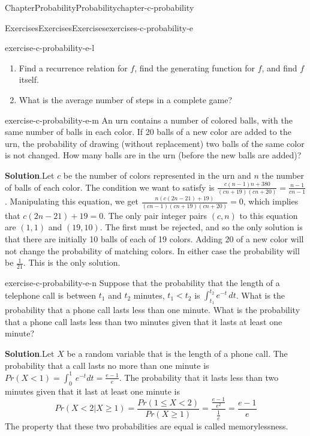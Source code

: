\documentclass[oneside,10pt,]{book}
\newcommand{\blocktitlefont}{\relax}
\numberwithin{equation}{section}
\newcommand{\lt}{<}
\begin{document}
\begin{chapterptx}{Chapter}{Probability}{}{Probability}{}{}{chapter-c-probability}
\begin{exercises-section}{Exercises}{Exercises}{}{Exercises}{}{}{exercises-c-probability-e}
\begin{divisionexercise}{11}{}{}{exercise-c-probability-e-l}
\begin{enumerate}[label=(\alph*)]
\item{}Find a recurrence relation for \(f\), find the generating function for \(f\), and find \(f\) itself.%
\item{}What is the average number of steps in a complete game?%
\end{enumerate}
%
\end{divisionexercise}%
\begin{divisionexercise}{12}{}{}{exercise-c-probability-e-m}%
An urn contains a number of colored balls, with the same number of balls in each color. If 20 balls of a new color are added to the urn, the probability of drawing (without replacement) two balls of the same color is not changed. How many balls are in the urn (before the new balls are added)?%
\par\smallskip%
\noindent\textbf{\blocktitlefont Solution}.\hypertarget{solution-c-probability-e-m-b}{}\quad{}Let \(c\) be the number of colors represented in the urn and \(n\) the number of balls of each color.  The condition we want to satisfy is \(\frac{c (n-1) n+380}{(c n+19)
(c n+20)}=\frac{n-1}{c n-1}\).  Manipulating this equation, we get \(\frac{n (c (2 n-21)+19)}{(c
n-1) (c n+19) (c n+20)}=0\), which implies that \(c(2 n-21)+19=0\).  The only pair integer pairs \((c,n)\) to this equation are \((1,1)\) and \((19,10)\).  The first must be rejected, and so the only solution is that there are initially 10 balls of each of 19 colors. Adding 20 of a new color will not change the probability of matching colors.  In either case the probability will be \(\frac{1}{21}\). This is the only solution.%
\end{divisionexercise}%
\begin{divisionexercise}{13}{}{}{exercise-c-probability-e-n}%
Suppose that the probability that the length of a telephone call is between \(t_1\) and \(t_2\) minutes,  \(t_1 \lt t_2\) is \(\int_{t_1}^{t_2} e^{-t} \, dt\).   What is the probability that a phone call lasts less than one minute.  What is the probability that a phone call lasts less than two minutes given that it lasts at least one minute?%
\par\smallskip%
\noindent\textbf{\blocktitlefont Solution}.\hypertarget{solution-c-probability-e-n-b}{}\quad{}Let \(X\) be a random variable that is the length of a phone call. The probability that a call lasts no more than one minute is \(Pr(X \lt 1) = \int_{0}^{1} \, e^{-t} dt = \frac{e-1}{e}\).  The probability that it lasts less than two minutes given that it last at least one minute is%
\begin{equation*}
Pr(X \lt 2 | X \geq 1)= \frac{Pr(1 \leq X \lt 2)}{Pr(X \geq 1)} = \frac{\frac{e-1}{e^2}}{\frac{1}{e}}=\frac{e-1}{e}
\end{equation*}
The property that these two probabilities are equal is called  memorylessness.%
\end{divisionexercise}%
\end{exercises-section}
\end{chapterptx}
\end{document}

